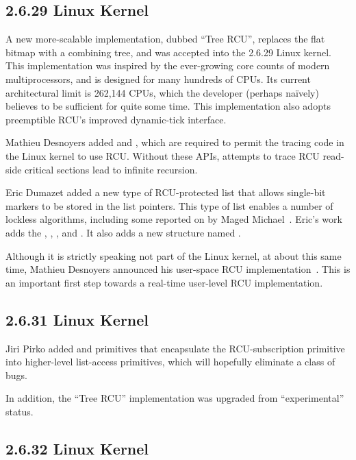 \subsection{2.6.29 Linux Kernel}

A new more-scalable implementation, dubbed ``Tree RCU'', replaces
the flat bitmap with a combining tree, and was accepted into the 2.6.29
Linux kernel.
This implementation was inspired by the ever-growing core counts of
modern multiprocessors, and is designed for many hundreds of CPUs.
Its current architectural limit is 262,144 CPUs, which the developer
(perhaps na\"ively) believes to be sufficient for quite some time.
This implementation also adopts preemptible RCU's improved dynamic-tick
interface.

Mathieu Desnoyers added
 and
,
which are required to permit the tracing code in the Linux kernel
to use RCU.
Without these APIs, attempts to trace RCU read-side critical sections
lead to infinite recursion.

Eric Dumazet added a new type of RCU-protected list that allows single-bit
markers to be stored in the list pointers.
This type of list enables a number of lockless algorithms, including
some reported on by Maged Michael~\cite{MagedMichael04a}.
Eric's work adds the ,
, , and
.
It also adds a new structure named .

Although it is strictly speaking not part of the Linux kernel, 
at about this same time, Mathieu Desnoyers announced his user-space
RCU implementation~\cite{MathieuDesnoyers2009URCU}.
This is an important first step towards a real-time user-level RCU
implementation.

\subsection{2.6.31 Linux Kernel}

Jiri Pirko added  and 
primitives that encapsulate the  RCU-subscription
primitive into higher-level list-access primitives, which will hopefully
eliminate a class of bugs.

In addition, the ``Tree RCU'' implementation was upgraded from
``experimental'' status.

\subsection{2.6.32 Linux Kernel}

